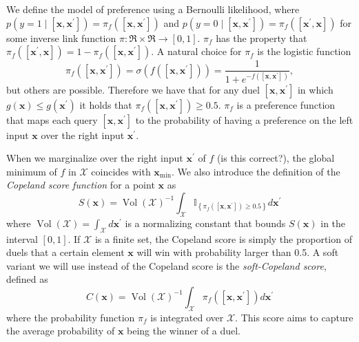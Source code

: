 \documentclass[
  letterpaper,
  DIV=11,
  numbers=noendperiod,
  oneside]{scrreprt}
\theoremstyle{remark}
\begin{document}
We define the model of preference using a Bernoulli likelihood, where
\(p\left(y=1 \mid\left[\mathbf{x}, \mathbf{x}^{\prime}\right]\right)=\pi_f\left(\left[\mathbf{x}, \mathbf{x}^{\prime}\right]\right)\)
and
\(p\left(y=0 \mid\left[\mathbf{x}, \mathbf{x}^{\prime}\right]\right)=\pi_f\left(\left[\mathbf{x}^{\prime}, \mathbf{x}\right]\right)\)
for some inverse link function \(\pi: \Re \times \Re \rightarrow[0,1]\).
\(\pi_f\) has the property that
\(\pi_f\left(\left[\mathbf{x}^{\prime}, \mathbf{x}\right]\right)=1-\pi_f\left(\left[\mathbf{x}, \mathbf{x}^{\prime}\right]\right)\).
A natural choice for \(\pi_f\) is the logistic function
\[\label{eq:bernoulli_pref}
\pi_f\left(\left[\mathbf{x}, \mathbf{x}^{\prime}\right]\right)=\sigma\left(f\left(\left[\mathbf{x}, \mathbf{x}^{\prime}\right]\right)\right)=\frac{1}{1+e^{-f\left(\left[\mathbf{x}, \mathbf{x}^{\prime}\right]\right)}},\]
but others are possible. Therefore we have that for any duel
\(\left[\mathbf{x}, \mathbf{x}^{\prime}\right]\) in which
\(g(\mathbf{x}) \leq g\left(\mathbf{x}^{\prime}\right)\) it holds that
\(\pi_f\left(\left[\mathbf{x}, \mathbf{x}^{\prime}\right]\right) \geq 0.5\).
\(\pi_f\) is a preference function that maps each query
\(\left[\mathbf{x}, \mathbf{x}^{\prime}\right]\) to the probability of
having a preference on the left input \(\mathbf{x}\) over the right
input \(\mathbf{x}^{\prime}\).

When we marginalize over the right input \(\mathbf{x}^{\prime}\) of
\(f\) (is this correct?), the global minimum of \(f\) in \(\mathcal{X}\)
coincides with \(\mathbf{x}_{\min }\). We also introduce the definition
of the \emph{Copeland score function} for a point \(\mathbf{x}\) as
\[S(\mathbf{x})=\operatorname{Vol}(\mathcal{X})^{-1} \int_{\mathcal{X}} \mathbb{I}_{\left\{\pi_f\left(\left[\mathbf{x}, \mathbf{x}^{\prime}\right]\right) \geq 0.5\right\}} d \mathbf{x}^{\prime}\]
where
\(\operatorname{Vol}(\mathcal{X})=\int_{\mathcal{X}} d \mathbf{x}^{\prime}\)
is a normalizing constant that bounds \(S(\mathbf{x})\) in the interval
\([0,1]\). If \(\mathcal{X}\) is a finite set, the Copeland score is
simply the proportion of duels that a certain element \(\mathbf{x}\)
will win with probability larger than 0.5. A soft variant we will use
instead of the Copeland score is the \emph{soft-Copeland score}, defined
as \[\label{eq:soft-copeland}
C(\mathbf{x})=\operatorname{Vol}(\mathcal{X})^{-1} \int_{\mathcal{X}} \pi_f\left(\left[\mathbf{x}, \mathbf{x}^{\prime}\right]\right) d \mathbf{x}^{\prime}\]
where the probability function \(\pi_f\) is integrated over
\(\mathcal{X}\). This score aims to capture the average probability of
\(\mathbf{x}\) being the winner of a duel.
\end{document}
